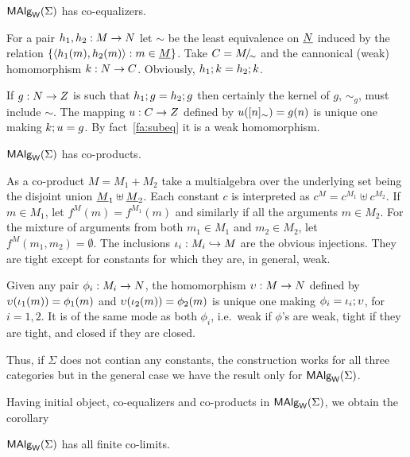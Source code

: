 \documentclass[10pt]{article}
\begin{document}
\begin{Lemma}
\label{le:coeql}
$\mbox{\rm\sf MAlg}_{\sf W}(\Sigma)$ has co-equalizers.
\end{Lemma}

\begin{Proof}
For a pair $h_1,h_2:M\rightarrow N$ let $\sim$ be the least equivalence on
$\underline {N}$ induced by the relation $\{\langle h_1(m),h_2(m)\rangle:m\in\underline {M}\}$. Take $C=M\!{\textstyle /}\!_{\sim}$ and the cannonical (weak) homomorphism 
$k:N\rightarrow C$. Obviously,
$h_1;k=h_2;k$.

If $g:N\rightarrow Z$ is such that $h_1;g=h_2;g$ then certainly
the kernel of $g$, $\sim_g$, must include $\sim$. The mapping
$u:C\rightarrow Z$ defined by $u([n]_\sim)=g(n)$ is unique one making
$k;u=g$. By fact~\ref{fa:subeq} it is a weak homomorphism.
\end{Proof}

\begin{Lemma}
\label{le:MASlcopr}
$\mbox{\rm\sf MAlg}_{\sf W}(\Sigma)$ has co-products.
\end{Lemma}

\begin{Proof}
As a co-product $M=M_1+M_2$ take a multialgebra over the underlying
set being the disjoint union $\underline {M}_1 \uplus \underline {M}_2$.  Each
constant $c$ is interpreted as $c^M=c^{M_1}\uplus c^{M_2}$.  If
$m \in M_1$, let
$f^M(m)=f^{M_1}(m)$ and similarly if all the
arguments $m\in M_2$. For the mixture of arguments from both
$m_1\in M_1$ and $m_2\in M_2$, let
$f^M(m_1,m_2)=\emptyset$. The inclusions $\iota_i:M_i\hookrightarrow M$
are the obvious injections. They are tight except for constants for
which they are, in general, weak.

Given any pair $\phi_i:M_i\rightarrow N$, the homomorphism $\upsilon:M\rightarrow N$
defined by $\upsilon(\iota_1(m))=\phi_1(m)$ and
$\upsilon(\iota_2(m))=\phi_2(m)$ is unique one making
$\phi_i=\iota_i;\upsilon$, for $i=1,2$. It is of the same mode as
both $\phi_i$, i.e.\ weak if $\phi$'s are weak, tight if they are
tight, and closed if they are closed.

Thus, if $\Sigma$ does not contian any constants, the construction
works for all three categories but in the general case we have the
result only for $\mbox{\rm\sf MAlg}_{\sf W}(\Sigma)$.
\end{Proof}

\noindent
Having initial object, co-equalizers and co-products in $\mbox{\rm\sf MAlg}_{\sf W}(\Sigma)$, we
obtain the corollary

\begin{Theorem}
\label{th:cocomp}
$\mbox{\rm\sf MAlg}_{\sf W}(\Sigma)$ has all finite co-limits.
\end{Theorem}
\end{document}
